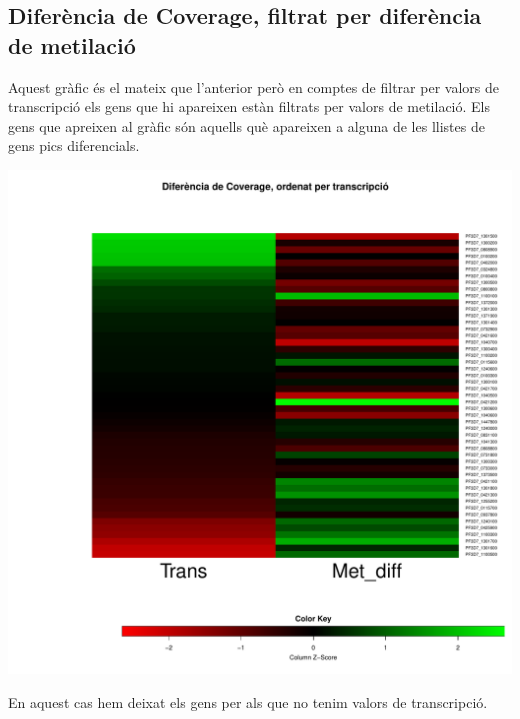 \documentclass{article}\usepackage[]{graphicx}\usepackage[]{color}
\newenvironment{knitrout}{}{} %
\begin{document}
\subsection{Diferència de Coverage, filtrat per diferència de metilació}
Aquest gràfic és el mateix que l'anterior però en comptes de filtrar per valors de transcripció els gens que hi apareixen estàn filtrats per valors de metilació. Els gens que apreixen al gràfic són aquells què apareixen a alguna de les llistes de gens pics diferencials.
\begin{knitrout}
\color{fgcolor}

{\centering \includegraphics[width=.9\linewidth]{figure/minimal-heat_cov_diff_filter-1} 

}



\end{knitrout}
\clearpage
En aquest cas hem deixat els gens per als que no tenim valors de transcripció.
\end{document}

